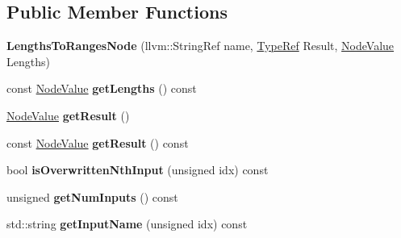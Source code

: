 \subsection*{Public Member Functions}
\begin{DoxyCompactItemize}
\item 
\mbox{\label{classglow_1_1_lengths_to_ranges_node_a176c5c2022c67d6a2101d917367baec2}} 
{\bfseries Lengths\+To\+Ranges\+Node} (llvm\+::\+String\+Ref name, \hyperlink{structglow_1_1_type}{Type\+Ref} Result, \hyperlink{structglow_1_1_node_value}{Node\+Value} Lengths)
\item 
\mbox{\label{classglow_1_1_lengths_to_ranges_node_a3279847af7cfc8e5a21747f32745464c}} 
const \hyperlink{structglow_1_1_node_value}{Node\+Value} {\bfseries get\+Lengths} () const
\item 
\mbox{\label{classglow_1_1_lengths_to_ranges_node_a945df8b898addbef8e0e2a9dd27dc80d}} 
\hyperlink{structglow_1_1_node_value}{Node\+Value} {\bfseries get\+Result} ()
\item 
\mbox{\label{classglow_1_1_lengths_to_ranges_node_a1acce52f69bf7b8f93b0b111f9e5b13e}} 
const \hyperlink{structglow_1_1_node_value}{Node\+Value} {\bfseries get\+Result} () const
\item 
\mbox{\label{classglow_1_1_lengths_to_ranges_node_af973276f1d4d9ecc341d008618383e98}} 
bool {\bfseries is\+Overwritten\+Nth\+Input} (unsigned idx) const
\item 
\mbox{\label{classglow_1_1_lengths_to_ranges_node_aed8aa2b0e2e68c63376021540d706a24}} 
unsigned {\bfseries get\+Num\+Inputs} () const
\item 
\mbox{\label{classglow_1_1_lengths_to_ranges_node_af08ed6940412d91aa0dc957122601f47}} 
std\+::string {\bfseries get\+Input\+Name} (unsigned idx) const
\item 
\mbox{\label{classglow_1_1_lengths_to_ranges_node_ac8a8558799f3aff0d8a4d15b0a08d236}} 

\end{DoxyCompactItemize}
